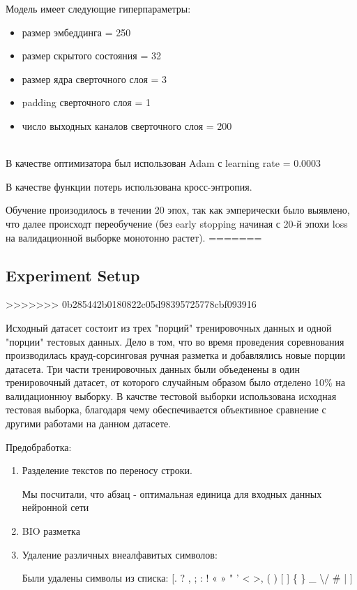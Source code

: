 \documentclass{article}
\begin{document}
Модель имеет следующие гиперпараметры:
\begin{itemize}
    \item размер эмбеддинга = 250
    \item размер скрытого состояния = 32 
    \item размер ядра сверточного слоя = 3
    \item padding сверточного слоя = 1
    \item число выходных каналов сверточного слоя = 200
\end{itemize}

\\

В качестве оптимизатора был использован Adam с learning rate = 0.0003

В качестве функции потерь использована кросс-энтропия.

Обучение произодилось в течении 20 эпох, так как эмперически было выявлено, что далее происходт переобучение (без early stopping начиная с 20-й эпохи loss на валидационной выборке монотонно растет).
=======
\subsection{Experiment Setup}
>>>>>>> 0b285442b0180822c05d98395725778cbf093916

Исходный датасет состоит из трех "порций" тренировочных данных и одной "порции" тестовых данных. Дело в том, что во время проведения соревнования производилась крауд-сорсинговая ручная разметка и добавлялись новые порции датасета. Три части тренировочных данных были объеденены в один тренировочный датасет, от которого случайным образом было отделено 10\% на валидационнюу выборку. В качстве тестовой выборки использована исходная тестовая выборка, благодаря чему обеспечивается объективное сравнение с другими работами на данном датасете.
\newline

Предобработка:

\begin{enumerate}
    \item Разделение текстов по переносу строки.
        
        Мы посчитали, что абзац - оптимальная единица для входных данных нейронной сети

    \item BIO разметка
    
    \item Удаление различных внеалфавитых символов:
    
        Были удалены символы из списка: [. ? , ; : ! « » " ' < >,  ( ) [ ] \{ \} \newline
         \─ \- \_ \textbackslash / \# \№ | ] %

\end{enumerate}  \\
\end{document}
